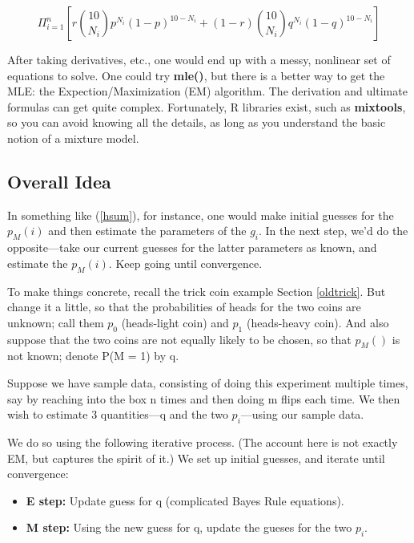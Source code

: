 \documentclass[11pt]{article}
\begin{document}
\begin{equation}
\Pi_{i=1}^n
\left [ r \binom{10}{N_i} p^{N_i} (1-p)^{10-N_i} +
(1-r) \binom{10}{N_i} q^{N_i} (1-q)^{10-N_i}
\right ]
\end{equation}

After taking derivatives, etc., one would end up with a messy, nonlinear
set of equations to solve.  One could try {\bf mle()}, but there is a
better way to get the MLE: the Expection/Maximization (EM) algorithm.
The derivation and ultimate formulas can get quite complex.
Fortunately, R libraries exist, such as {\bf mixtools}, so you can avoid
knowing all the details, as long as you understand the basic notion of a
mixture model.  

\subsection{Overall Idea}

In something like (\ref{hsum}), for instance, one would make initial
guesses for the $p_M(i)$ and then estimate the parameters of the $g_i$.
In the next step, we'd do the opposite---take our current guesses for
the latter parameters as known, and estimate the $p_M(i)$.  Keep going
until convergence.

To make things concrete, recall the trick coin example Section
\ref{oldtrick}.  But change it a little, so that the probabilities of
heads for the two coins are unknown; call them $p_0$ (heads-light coin)
and $p_1$ (heads-heavy coin).  And also suppose that the two coins are
not equally likely to be chosen, so that $p_M()$ is not known; denote
P(M = 1) by q.

Suppose we have sample data, consisting of doing this experiment
multiple times, say by reaching into the box n times and then doing m
flips each time.  We then wish to estimate 3 quantities---q and the two
$p_i$---using our sample data.  

We do so using the following iterative process.  (The account here is
not exactly EM, but captures the spirit of it.) We set up initial
guesses, and iterate until convergence:

\begin{itemize}

\item {\bf E step:} Update guess for q (complicated Bayes Rule equations).

\item {\bf M step:} Using the new guess for q, update the gueses for the
two $p_i$.

\end{itemize}
\end{document}
